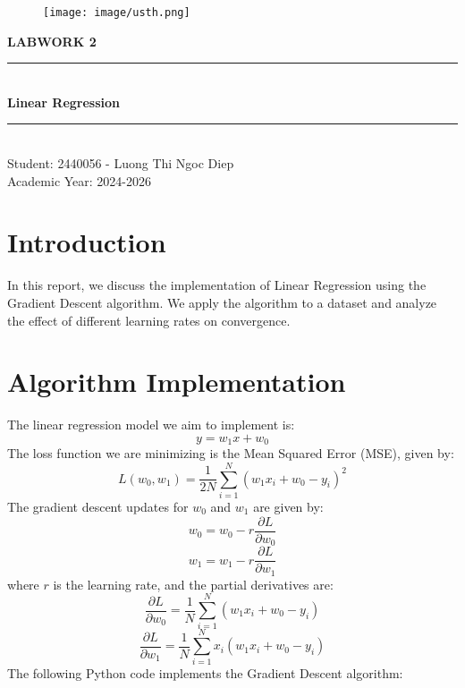 \documentclass[hidelinks]{report}
\begin{document}
\begin{titlepage}
\begin{center}
\begin{figure}
    \centering
    \texttt{[image: image/usth.png]}
\end{figure}

{\huge \bfseries \uppercase{Labwork 2 } \\[3cm] }

\rule{\linewidth}{0.3mm} \\[0.4cm]
{ \huge \bfseries\color{blue} Linear Regression}
\rule{\linewidth}{0.3mm} \\[0.5cm]
\Large{Student:} 2440056 - Luong Thi Ngoc Diep\\[0.3cm]
\large Academic Year: 2024-2026
    
\end{center}
\end{titlepage}

\clearpage
\pagestyle{plain} 
\setcounter{page}{1}

\section{Introduction}
In this report, we discuss the implementation of Linear Regression using the Gradient Descent algorithm. We apply the algorithm to a dataset and analyze the effect of different learning rates on convergence.

\section{Algorithm Implementation}
The linear regression model we aim to implement is:
\[
y = w_1 x + w_0
\]
The loss function we are minimizing is the Mean Squared Error (MSE), given by:
\[
L(w_0, w_1) = \frac{1}{2N} \sum_{i=1}^{N} (w_1 x_i + w_0 - y_i)^2
\]
The gradient descent updates for \(w_0\) and \(w_1\) are given by:
\[
w_0 = w_0 - r \frac{\partial L}{\partial w_0}
\]
\[
w_1 = w_1 - r \frac{\partial L}{\partial w_1}
\]
where \(r\) is the learning rate, and the partial derivatives are:
\[
\frac{\partial L}{\partial w_0} = \frac{1}{N} \sum_{i=1}^{N} (w_1 x_i + w_0 - y_i)
\]
\[
\frac{\partial L}{\partial w_1} = \frac{1}{N} \sum_{i=1}^{N} x_i (w_1 x_i + w_0 - y_i)
\]
The following Python code implements the Gradient Descent algorithm:
\end{document}
